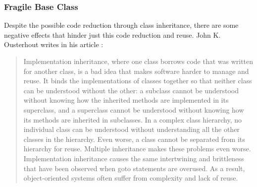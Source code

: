 %
%
%
%
%
%
%

\subsubsection{Fragile Base Class}
\label{fragile_base_class_heading}

Despite the possible code reduction through class inheritance, there are some
negative effects that hinder just this code reduction and reuse. John K.
Ousterhout writes in his article \cite{ousterhout1998}:

\begin{quote}
    Implementation inheritance, where one class borrows code that was written
    for another class, is a bad idea that makes software harder to manage and
    reuse. It binds the implementations of classes together so that neither
    class can be understood without the other: a subclass cannot be understood
    without knowing how the inherited methods are implemented in its superclass,
    and a superclass cannot be understood without knowing how its methods are
    inherited in subclasses. In a complex class hierarchy, no individual class
    can be understood without understanding all the other classes in the
    hierarchy. Even worse, a class cannot be separated from its hierarchy for
    reuse. Multiple inheritance makes these problems even worse. Implementation
    inheritance causes the same intertwining and brittleness that have been
    observed when goto statements are overused. As a result, object-oriented
    systems often suffer from complexity and lack of reuse.
\end{quote}

